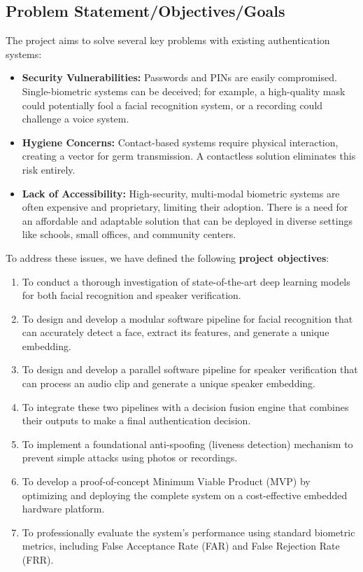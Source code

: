 \documentclass[12pt, a4paper]{article}
\begin{document}
\subsection{Problem Statement/Objectives/Goals}
The project aims to solve several key problems with existing authentication systems:
\begin{itemize}
    \item \textbf{Security Vulnerabilities:} Passwords and PINs are easily compromised. Single-biometric systems can be deceived; for example, a high-quality mask could potentially fool a facial recognition system, or a recording could challenge a voice system.
    \item \textbf{Hygiene Concerns:} Contact-based systems require physical interaction, creating a vector for germ transmission. A contactless solution eliminates this risk entirely.
    \item \textbf{Lack of Accessibility:} High-security, multi-modal biometric systems are often expensive and proprietary, limiting their adoption. There is a need for an affordable and adaptable solution that can be deployed in diverse settings like schools, small offices, and community centers.
\end{itemize}

To address these issues, we have defined the following \textbf{project objectives}:
\begin{enumerate}
    \item To conduct a thorough investigation of state-of-the-art deep learning models for both facial recognition and speaker verification.
    \item To design and develop a modular software pipeline for facial recognition that can accurately detect a face, extract its features, and generate a unique embedding.
    \item To design and develop a parallel software pipeline for speaker verification that can process an audio clip and generate a unique speaker embedding.
    \item To integrate these two pipelines with a decision fusion engine that combines their outputs to make a final authentication decision.
    \item To implement a foundational anti-spoofing (liveness detection) mechanism to prevent simple attacks using photos or recordings.
    \item To develop a proof-of-concept Minimum Viable Product (MVP) by optimizing and deploying the complete system on a cost-effective embedded hardware platform.
    \item To professionally evaluate the system's performance using standard biometric metrics, including False Acceptance Rate (FAR) and False Rejection Rate (FRR).
\end{enumerate}
\end{document}
